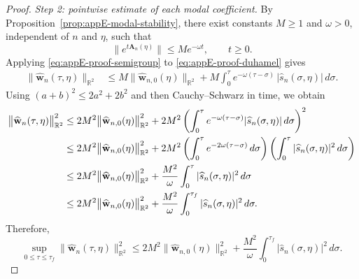 \begin{proof}
    \smallskip
    \noindent
    \textit{Step 2: pointwise estimate of each modal coefficient.}
    By Proposition~\ref{prop:appE-modal-stability}, there exist constants
    \(M\ge 1\) and \(\omega>0\), independent of \(n\) and \(\eta\), such that
    \begin{equation}
        \bigl\|e^{t\mathbf A_n(\eta)}\bigr\|
        \le
        M e^{-\omega t},
        \qquad t\ge 0.
        \label{eq:appE-proof-semigroup}
    \end{equation}
    Applying \eqref{eq:appE-proof-semigroup} to
    \eqref{eq:appE-proof-duhamel} gives
    \begin{align}
        \bigl\|\widehat{\mathbf w}_n(\tau,\eta)\bigr\|_{\mathbb R^2}
         & \le
        M\bigl\|\widehat{\mathbf w}_{n,0}(\eta)\bigr\|_{\mathbb R^2}
        +
        M\int_0^\tau
        e^{-\omega(\tau-\sigma)}\,|\widehat s_n(\sigma,\eta)|\, d\sigma.
        \label{eq:appE-proof-modal-bound-L1}
    \end{align}
    Using \((a+b)^2\le 2a^2+2b^2\) and then Cauchy--Schwarz in time, we obtain
    \begin{align}
        \bigl\|\widehat{\mathbf w}_n(\tau,\eta)\bigr\|_{\mathbb R^2}^2
         & \le
        2M^2\bigl\|\widehat{\mathbf w}_{n,0}(\eta)\bigr\|_{\mathbb R^2}^2
        +
        2M^2
        \left(
        \int_0^\tau
        e^{-\omega(\tau-\sigma)}|\widehat s_n(\sigma,\eta)|\, d\sigma
        \right)^2
        \notag \\
         & \le
        2M^2\bigl\|\widehat{\mathbf w}_{n,0}(\eta)\bigr\|_{\mathbb R^2}^2
        +
        2M^2
        \left(
        \int_0^\tau e^{-2\omega(\tau-\sigma)}\, d\sigma
        \right)
        \left(
        \int_0^\tau |\widehat s_n(\sigma,\eta)|^2\, d\sigma
        \right)
        \notag \\
         & \le
        2M^2\bigl\|\widehat{\mathbf w}_{n,0}(\eta)\bigr\|_{\mathbb R^2}^2
        +
        \frac{M^2}{\omega}
        \int_0^\tau |\widehat s_n(\sigma,\eta)|^2\, d\sigma
        \notag \\
         & \le
        2M^2\bigl\|\widehat{\mathbf w}_{n,0}(\eta)\bigr\|_{\mathbb R^2}^2
        +
        \frac{M^2}{\omega}
        \int_0^{\tau_f} |\widehat s_n(\sigma,\eta)|^2\, d\sigma.
        \label{eq:appE-proof-modal-bound-L2}
    \end{align}
    Therefore,
    \begin{equation}
        \sup_{0\le \tau\le \tau_f}
        \bigl\|\widehat{\mathbf w}_n(\tau,\eta)\bigr\|_{\mathbb R^2}^2
        \le
        2M^2\bigl\|\widehat{\mathbf w}_{n,0}(\eta)\bigr\|_{\mathbb R^2}^2
        +
        \frac{M^2}{\omega}
        \int_0^{\tau_f} |\widehat s_n(\sigma,\eta)|^2\, d\sigma.
        \label{eq:appE-proof-uniform-modal-bound}
    \end{equation}


\end{proof}
